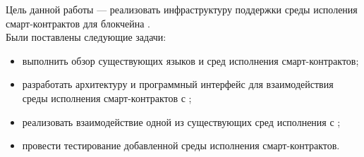 Цель данной работы --- реализовать инфраструктуру поддержки среды исполения смарт-контрактов для блокчейна .
\\

Были поставлены следующие задачи:
\begin{itemize}
    \item выполнить обзор существующих языков и сред исполнения смарт-кон\-трак\-тов;
    \item разработать архитектуру и программный интерфейс для взаимодействия среды исполнения смарт-контрактов с ;
    \item реализовать взаимодействие одной из существующих сред исполнения с ;
    \item провести тестирование добавленной среды исполнения смарт-кон\-трак\-тов.
\end{itemize}
